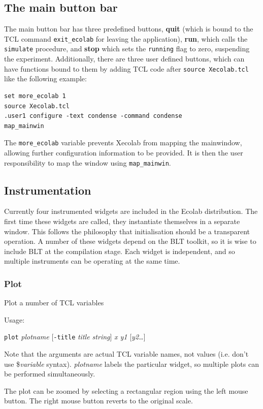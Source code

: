 \subsection{The main button bar}

The main button bar has three predefined buttons, {\bf quit} (which is
bound to the TCL command {\tt exit\_ecolab} for leaving the
application), {\bf run}, which calls the {\tt simulate} procedure, and
{\bf stop} which sets the {\tt running} flag to zero, suspending the
experiment. Additionally, there are three user defined buttons, which
can have functions bound to them by adding TCL code after {\tt source
  Xecolab.tcl} like  the following example:
\begin{verbatim}
set more_ecolab 1
source Xecolab.tcl
.user1 configure -text condense -command condense
map_mainwin
\end{verbatim}
The \verb+more_ecolab+ variable prevents Xecolab from mapping the
mainwindow, allowing further configuration information to be
provided. It is then the user responsibility to map the window using
\verb+map_mainwin+. 

\subsection{Instrumentation}

Currently four instrumented widgets are included in the Ecolab
distribution. The first time these widgets are called, they
instantiate themselves in a separate window. This follows the
philosophy that initialisation should be a transparent operation. A
number of these widgets depend on the BLT toolkit, so it is wise to
include BLT at the compilation stage. Each widget is independent, and
so multiple instruments can be operating at the same time.

\subsubsection{Plot}

Plot a number of TCL variables

Usage:

{\tt plot} {\em plotname} [{\tt -title} {\em title string}] {\em x y1}
[{\em y2\ldots}]

Note that the arguments are actual TCL variable names, not values
(i.e. don't use \${\em variable} syntax). {\em plotname} labels the
particular widget, so multiple plots can be performed simultaneously.

The plot can be zoomed by selecting a rectangular region using the
left mouse button. The right mouse button reverts to the original scale.

